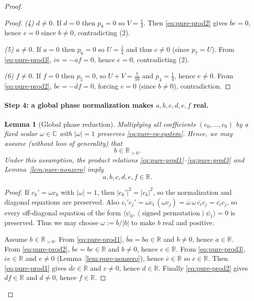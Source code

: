 \documentclass[11pt]{article}
\newtheorem{lemma}{Lemma}
\begin{document}
\begin{proof}
\begin{proof}
\emph{(4) $d\neq 0$.}
If $d=0$ then $p_8=0$ so $V=\frac14$.
Then \eqref{eq:pure-prod2} gives $\overline{b}e=0$, hence $e=0$ since $b\neq 0$, contradicting (2).

\emph{(5) $a\neq 0$.}
If $a=0$ then $p_6=0$ so $U=\frac14$ and thus $c\neq 0$ (since $p_7=U$).
From \eqref{eq:pure-prod3}, $\overline{c}e=-\overline{a}f=0$, hence $e=0$, contradicting (2).

\emph{(6) $f\neq 0$.}
If $f=0$ then $p_5=0$, so $U+V=\frac{7}{16}$ and $p_4=\frac14$, hence $e\neq 0$.
From \eqref{eq:pure-prod2}, $\overline{b}e=-\overline{d}f=0$, forcing $e=0$ (since $b\neq 0$), contradiction.
\end{proof}

\paragraph{Step 4: a global phase normalization makes $a,b,c,d,e,f$ real.}

\begin{lemma}[Global phase reduction]
\label{lem:pure-phase}
Multiplying all coefficients $(c_0,\dots,c_9)$ by a fixed scalar $\omega\in\mathbb C$ with $|\omega|=1$
preserves \eqref{eq:pure-eq-system}. Hence, we may assume (without loss of generality) that
\[
b\in\mathbb R_{>0}.
\]
Under this assumption, the product relations \eqref{eq:pure-prod1}--\eqref{eq:pure-prod3} and Lemma~\ref{lem:pure-nonzero}
imply
\[
a,b,c,d,e,f\in\mathbb R.
\]
\end{lemma}

\begin{proof}
If $c_k'=\omega c_k$ with $|\omega|=1$, then $|c_k'|^2=|c_k|^2$, so the normalization and diagonal equations are preserved.
Also $\overline{c_i'}c_j'=\overline{\omega c_i}\,(\omega c_j)=\overline\omega\,\omega\,\overline{c_i}c_j=\overline{c_i}c_j$,
so every off-diagonal equation of the form $\langle \psi_0,(\text{signed permutation})\psi_1\rangle=0$ is preserved.
Thus we may choose $\omega:=\overline{b}/|b|$ to make $b$ real and positive.

Assume $b\in\mathbb R_{>0}$. From \eqref{eq:pure-prod1}, $\overline{b}a=ba\in\mathbb R$ and $b\neq 0$, hence $a\in\mathbb R$.
From \eqref{eq:pure-prod2}, $\overline{b}e=be\in\mathbb R$ and $b\neq 0$, hence $e\in\mathbb R$.
From \eqref{eq:pure-prod3}, $\overline{c}e\in\mathbb R$ and $e\neq 0$ (Lemma~\ref{lem:pure-nonzero}), hence $\overline{c}\in\mathbb R$ so $c\in\mathbb R$.
Then \eqref{eq:pure-prod1} gives $\overline{d}c\in\mathbb R$ and $c\neq 0$, hence $d\in\mathbb R$.
Finally \eqref{eq:pure-prod2} gives $\overline{d}f\in\mathbb R$ and $d\neq 0$, hence $f\in\mathbb R$.
\end{proof}


\end{proof}
\end{document}
